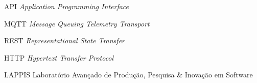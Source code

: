 \begin{siglas}
  \item [API] \textit{Application Programming Interface}
  \item [MQTT] \textit{Message Queuing Telemetry Transport}
  \item [REST] \textit{Representational State Transfer}
  \item [HTTP] \textit{Hypertext Transfer Protocol}
  \item [LAPPIS] Laboratório Avançado de Produção, Pesquisa & Inovação em Software

\end{siglas}
